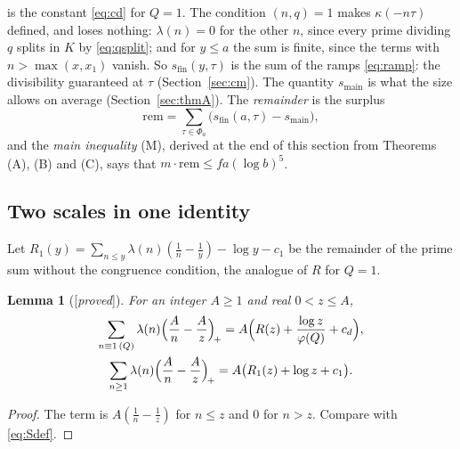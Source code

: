\documentclass[11pt]{amsart}
\numberwithin{equation}{section}
\newtheorem{lemma}[theorem]{Lemma}
\theoremstyle{definition}
\theoremstyle{remark}
\newcommand{\status}[1]{\textup{[\emph{#1}]}}
\begin{document}
is the constant \eqref{eq:cd} for $Q=1$. The condition $(n,q)=1$ makes $\kappa(-n\tau)$ defined, and loses nothing: $\lambda(n)=0$ for the other $n$, since every prime dividing $q$ splits in $K$ by \eqref{eq:qsplit}; and for $y\le a$ the sum is finite, since the terms with $n>\max(x,x_1)$ vanish. So $s_{\mathrm{fin}}(y,\tau)$ is the sum of the ramps \eqref{eq:ramp}: the divisibility guaranteed at $\tau$ (Section~\ref{sec:cm}). The quantity $s_{\mathrm{main}}$ is what the size allows on average (Section~\ref{sec:thmA}). The \emph{remainder} is the surplus
\begin{equation}\label{eq:rem}
 \mathrm{rem}=\sum_{\tau\in\Phi_a}\bigl(s_{\mathrm{fin}}(a,\tau)-s_{\mathrm{main}}\bigr),
\end{equation}
and the \emph{main inequality} (M), derived at the end of this section from Theorems (A), (B) and (C), says that $m\cdot\mathrm{rem}\le fa(\log b)^5$.

\subsection*{Two scales in one identity}
Let $R_1(y)=\sum_{n\le y}\lambda(n)(\frac1n-\frac1y)-\log y-c_1$ be the remainder of the prime sum without the congruence condition, the analogue of $R$ for $Q=1$.

\begin{lemma}[\status{proved}]\label{lem:posPart}
For an integer $A\ge1$ and real $0<z\le A$,
\begin{gather}
 \sum_{n\equiv1\,(Q)}\lambda(n)\Bigl(\frac An-\frac Az\Bigr)_{\!+}=A\Bigl(R(z)+\frac{\log z}{\varphi(Q)}+c_d\Bigr),\\
 \sum_{n\ge1}\lambda(n)\Bigl(\frac An-\frac Az\Bigr)_{\!+}=A\bigl(R_1(z)+\log z+c_1\bigr).
\end{gather}
\end{lemma}
\begin{proof}
The term is $A(\frac1n-\frac1z)$ for $n\le z$ and $0$ for $n>z$. Compare with \eqref{eq:Sdef}.
\end{proof}
\end{document}
